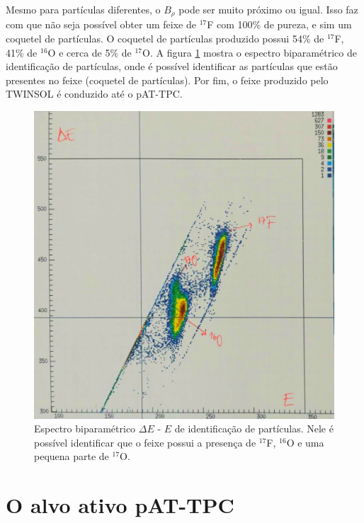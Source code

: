 \documentclass[a4paper,12pt,oneside]{book}
\begin{document}

\par Mesmo para partículas diferentes, o $B_{\rho}$ pode ser muito próximo ou igual. Isso faz com que não seja possível obter um feixe de $^{17}$F com 100\% de pureza, e sim um coquetel de partículas\cite{zamora_mater}. O coquetel de partículas produzido possui 54\% de $^{17}$F, 41\% de $^{16}$O e cerca de 5\% de $^{17}$O. A figura \ref{fig:PID_17F} mostra o espectro biparamétrico de identificação de partículas, onde é possível identificar as partículas que estão presentes no feixe (coquetel de partículas). Por fim, o feixe  produzido pelo TWINSOL é conduzido até o pAT-TPC.

\begin{figure}[H]
    \centering
    \includegraphics[scale = 0.12]{figs/pid_17F.png}
    \caption{Espectro biparamétrico $\Delta E$ - $E$ de identificação de partículas. Nele é possível identificar que o feixe possui a presença de $^{17}$F, $^{16}$O e uma pequena parte de $^{17}$O.}
    \label{fig:PID_17F}
\end{figure}

\section{O alvo ativo pAT-TPC}
\end{document}
